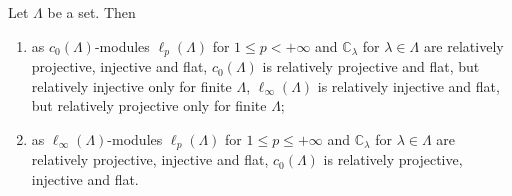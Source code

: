 \begin{proposition}\label{c0AndlInftyModsRelTh} Let $\Lambda$ be a set. Then

\begin{enumerate}[label = (\roman*)]
    \item as $c_0(\Lambda)$-modules $\ell_p(\Lambda)$ for $1\leq p<+\infty$ and
    $\mathbb{C}_\lambda$ for $\lambda\in\Lambda$ are relatively projective,
    injective and flat, $c_0(\Lambda)$ is relatively projective and flat, but
    relatively injective only for finite $\Lambda$, $\ell_\infty(\Lambda)$ is
    relatively injective and flat, but relatively projective only for finite
    $\Lambda$;

    \item as $\ell_\infty(\Lambda)$-modules $\ell_p(\Lambda)$ for 
    $1\leq p\leq+\infty$ and $\mathbb{C}_\lambda$ for $\lambda\in\Lambda$ 
    are relatively projective, injective and flat, $c_0(\Lambda)$ is 
    relatively projective, injective and flat.
\end{enumerate}
\end{proposition}
